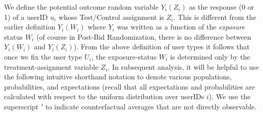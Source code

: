 \documentclass[11pt,a4paper]{article}
\theoremstyle{definition}
\theoremstyle{remark}
\theoremstyle{definition}
\theoremstyle{definition}
\theoremstyle{definition}
\theoremstyle{definition}
\theoremstyle{definition}
\theoremstyle{definition}
\begin{document}
We define the potential outcome random variable $Y_i(Z_i)$ as the response (0 or 1) of a userID $u_i$ whose Test/Control assignment is $Z_i$. This is different from the earlier definition $Y_i(W_i)$ where $Y_i$ was written as a function of the \textit{exposure} status $W_i$ (of course in Post-Bid Randomization, there is no difference between $Y_i(W_i)$ and $Y_i(Z_i)$). 
From the above definition of user types it follows that once we fix the user type $U_i$, the exposure-status $W_i$ is determined only by the treatment-assignment variable $Z_i$. In subsequent analysis, it will be helpful to use the following intuitive shorthand notation to denote various populations, probabilities, and expectations (recall that all expectations and probabilities are calculated with respect to the uniform distribution over userIDs $i$). We use the superscript $'$ to indicate counterfactual averages that are not directly observable. 
\end{document}
